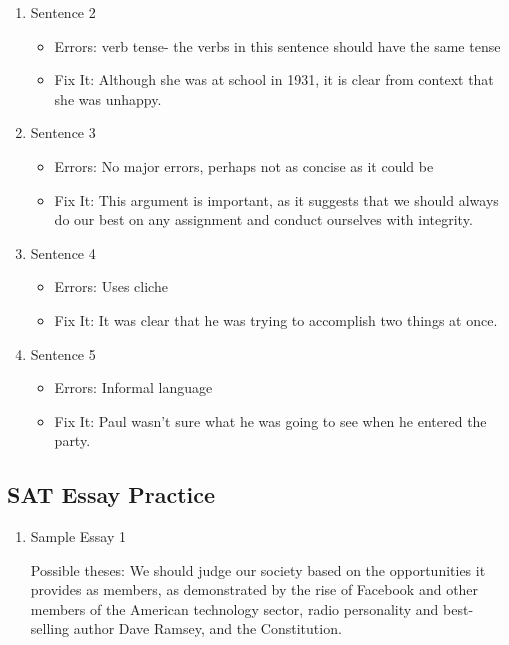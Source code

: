 \begin{enumerate}
\begin{enumerate}
\item Sentence 2

\begin{itemize}
\item Errors: verb tense- the verbs in this sentence should have the same tense
\item Fix It: Although she was at school in 1931, it is clear from context that she was unhappy. 
\end{itemize}

\item Sentence 3

\begin{itemize}
\item Errors: No major errors, perhaps not as concise as it could be
\item Fix It: This argument is important, as it suggests that we should always do our best on any assignment and conduct ourselves with integrity. 
\end{itemize}

\item Sentence 4

\begin{itemize}
\item Errors: Uses cliche
\item Fix It: It was clear that he was trying to accomplish two things at once. 
\end{itemize}

\item Sentence 5

\begin{itemize}
\item Errors: Informal language
\item Fix It: Paul wasn’t sure what he was going to see when he entered the party. 
\end{itemize}

\end{enumerate}

\subsection{SAT Essay Practice}

\begin{enumerate}
\item Sample Essay 1

Possible theses: We should judge our society based on the opportunities it provides as members, as demonstrated by the rise of Facebook and other members of the American technology sector, radio personality and best-selling author Dave Ramsey, and the Constitution. 


\end{enumerate}
\end{enumerate}
